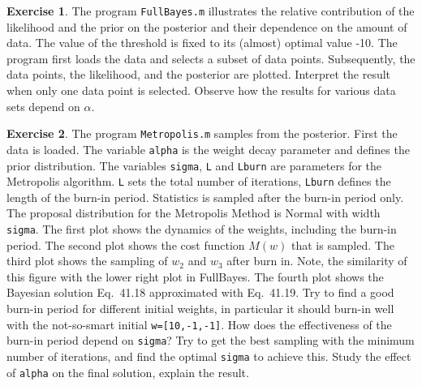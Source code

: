 \documentclass[a4paper]{article}
\theoremstyle{definition}
\newtheorem{ex}{Exercise}
\begin{document}
\begin{ex}

The program \texttt{FullBayes.m} illustrates the relative contribution of the likelihood and the prior on the posterior and their dependence on the amount of data. The value of the threshold is fixed to its (almost) optimal value -10. The program first loads the data and selects a subset of data points. Subsequently, the data points, the likelihood, and the posterior are plotted. Interpret the result when only one data point is selected. Observe how the results for various data sets depend on $\alpha$. \\

\end{ex}
\begin{ex}

The program \texttt{Metropolis.m} samples from the posterior. First the data is loaded. The variable \texttt{alpha} is the weight decay parameter and defines the prior distribution. The variables \texttt{sigma}, \texttt{L} and \texttt{Lburn} are parameters for the Metropolis algorithm. \texttt{L} sets the total number of iterations, \texttt{Lburn} defines the length of the burn-in period. Statistics is sampled after the burn-in period only. The proposal distribution for the Metropolis Method is Normal with width \texttt{sigma}. The first plot shows the dynamics of the weights, including the burn-in period. The second plot shows the cost function $M(w)$ that is sampled. The third plot shows the sampling of $w_2$ and $w_3$ after burn in. Note, the similarity of this figure with the lower right plot in FullBayes. The fourth plot shows the Bayesian solution Eq.~41.18 approximated with Eq.~41.19. Try to find a good burn-in period for different initial weights, in particular it should burn-in well with the not-so-smart initial \texttt{w=[10,-1,-1]}. How does the effectiveness of the burn-in period depend on \texttt{sigma}? Try to get the best sampling with the minimum number of iterations, and find the optimal \texttt{sigma} to achieve this. Study the effect of \texttt{alpha} on the final solution, explain the result. \\

\end{ex}
\end{document}
